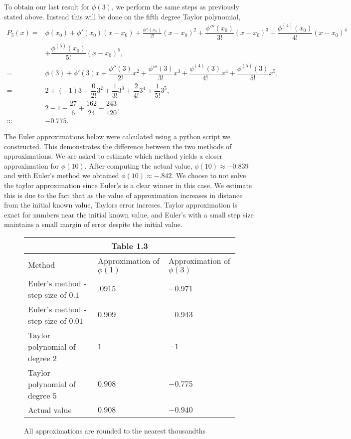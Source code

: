 \documentclass[12pt, letterpaper]{article}  %
\begin{document}
\newpage
To obtain our last result for $\phi(3)$, we perform the same steps as previously stated above. Instead this will
be done on the fifth degree Taylor polynomial, 
\begin{align*}
  P_5(x) =& \phi(x_0) + \phi'(x_0)(x-x_0) + \frac{\phi''(x_0)}{2!}(x-x_0)^2 
  + \dfrac{\phi'''(x_0)}{3!}(x-x_0)^3 + \dfrac{\phi^{(4)}(x_0)}{4!}(x-x_0)^4 \\
          &+ \dfrac{\phi^{(5)}(x_0)}{5!}(x-x_0)^5, \\
  =& \phi(3) + \phi'(3)x + \dfrac{\phi''(3)}{2!}x^2 + \dfrac{\phi'''(3)}{3!}x^3 
+ \dfrac{\phi^{(4)}(3)}{4!}x^4 + \dfrac{\phi^{(5)}(3)}{5!}x^5, \\
  =& 2 + (-1)3 + \dfrac{0}{2!}3^2 + \dfrac{1}{3!}3^3 + \dfrac{2}{4!}3^4 + \dfrac{1}{5!}3^5, \\
  =& 2 - 1 - \dfrac{27}{6} + \dfrac{162}{24} - \dfrac{243}{120}, \\
  \approx& -0.775.
\end{align*}

The Euler approximations below were calculated using a python script we constructed.  This demonstrates the difference between the two methods
of approximations.  We are asked to estimate which method yields a closer approximation for $\phi(10)$.  After computing the actual value, $\phi(10) \approx -0.839$
and with Euler's method we obtained $\phi(10) \approx -.842$. We choose to not solve the taylor approximation since Euler's is a clear winner in this case.  We estimate this
is due to the fact that as the value of approximation increases in distance from the initial known value, Taylors error increses. Taylor approximation is exact for numbers near the 
initial known value, and Euler's with a small step size maintains a small margin of error despite the initial value.
\begin{figure}[h]
  \noindent\begin{tabular}{|p{6cm}||p{4cm}|p{4cm}|}
  \hline
  \multicolumn{3}{|c|}{Table 1.3} \\
  \hline
  Method& Approximation of $\phi(1)$&Approximation of $\phi(3)$\\
  \hline
  Euler's method - step size of $0.1$& $.0915$  & $-0.971$\\
  Euler's method - step size of $0.01$& $0.909$ & $-0.943$\\
  Taylor polynomial of degree $2$ & $1$ & $-1$\\
  Taylor polynomial of degree $5$ & $0.908$ & $-0.775$\\
  Actual value & $0.908$ & $-0.940$ \\
  \hline
  \end{tabular}
  \caption{All approximations are rounded to the nearest thousandths}
  \label{fig_1}
\end{figure}
\end{document}
